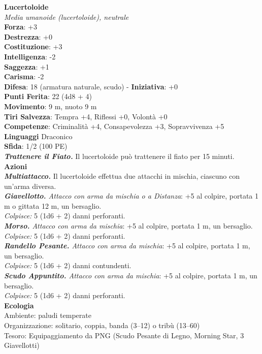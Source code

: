 \begin{multicols}{2}
\medskip\textbf{Lucertoloide}\\
\emph{Media umanoide (lucertoloide), neutrale}\\
\textbf{Forza}: +3\\
\textbf{Destrezza}: +0\\
\textbf{Costituzione}: +3\\
\textbf{Intelligenza}: -2\\
\textbf{Saggezza}: +1\\
\textbf{Carisma}: -2\\
\textbf{Difesa}: 18 (armatura naturale, scudo) - \textbf{Iniziativa}: +0\\
\textbf{Punti Ferita}: 22 (4d8 + 4)\\
\textbf{Movimento}: 9 m, nuoto 9 m\\
\textbf{Tiri Salvezza}: Tempra +4, Riflessi +0, Volontà +0\\
\textbf{Competenze}: Criminalità +4, Consapevolezza +3, Sopravvivenza +5\\
\textbf{Linguaggi} Draconico\\
\textbf{Sfida}: 1/2 (100 PE)\smallskip\\

\emph{\textbf{Trattenere il Fiato.}} Il lucertoloide può trattenere il fiato per 15 minuti.\\
\smallskip\textbf{Azioni}\\
\emph{\textbf{Multiattacco.}} Il lucertoloide effettua due attacchi in mischia, ciascuno con un'arma diversa.\\
\emph{\textbf{Giavellotto.} Attacco con arma da mischia o a Distanza}: +5 al colpire, portata 1 m o gittata 12 m, un bersaglio. \\
\emph{Colpisce:} 5 (1d6 + 2) danni perforanti.\\
\emph{\textbf{Morso.} Attacco con arma da mischia}: +5 al colpire, portata 1 m, un bersaglio.\\
\emph{Colpisce:} 5 (1d6 + 2) danni perforanti.\\
\emph{\textbf{Randello Pesante.} Attacco con arma da mischia}: +5 al colpire, portata 1 m, un bersaglio.\\
\emph{Colpisce:} 5 (1d6 + 2) danni contundenti. \\
\emph{\textbf{Scudo Appuntito.} Attacco con arma da mischia}: +5 al colpire, portata 1 m, un bersaglio.\\
\emph{Colpisce:} 5 (1d6 + 2) danni perforanti.\\
\textbf{Ecologia}\\
Ambiente: paludi temperate\\
Organizzazione: solitario, coppia, banda (3–12) o tribù (13–60)\\
Tesoro: Equipaggiamento da PNG (Scudo Pesante di Legno, Morning Star, 3 Giavellotti)\\


\end{multicols}
